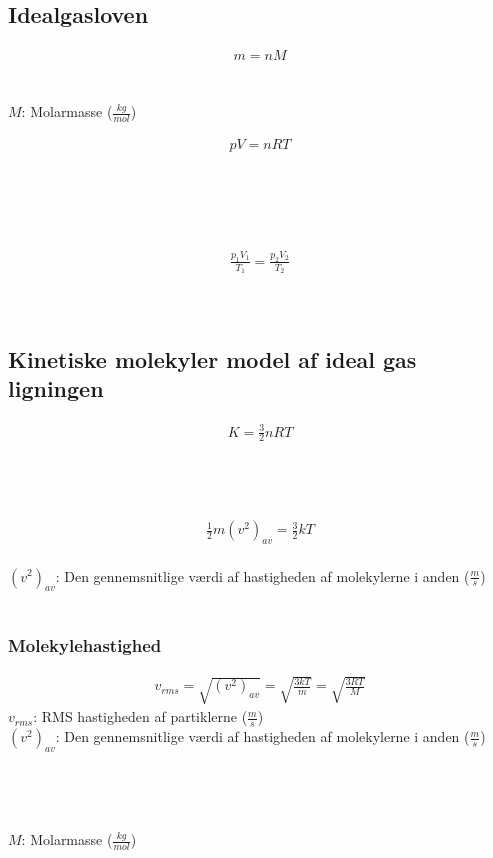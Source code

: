 \subsection{Idealgasloven}
	\begin{align}
		m=nM
	\end{align}
	\masse\\
	\mol\\
	$M$: Molarmasse ($\frac{kg}{mol}$)

	\begin{align}
		pV=nRT
	\end{align}
	\tryk\\
	\volumen\\
	\mol\\
	\idealgaskonst\\
	\tempk

	\begin{align}
		\frac{p_1V_1}{T_1}=\frac{p_2V_2}{T_2}
	\end{align}
	\tryk\\
	\volumen\\
	\tempk

	\newpage
\subsection{Kinetiske molekyler model af ideal gas ligningen}
	\begin{align}
		K=\frac{3}{2}nRT
	\end{align}
	\kinenergi\\
	\mol\\
	\idealgaskonst\\
	\tempk

	\begin{align}
		\frac{1}{2}m(v^2)_{av}=\frac{3}{2}kT
	\end{align}
	\masse\\
	$(v^2)_{av}$: Den gennemsnitlige værdi af hastigheden af molekylerne i anden ($\frac{m}{s}$)\\
	\boltzkonst\\
	\tempk

	\subsubsection{Molekylehastighed}
		\begin{align}
			v_{rms}=\sqrt{(v^2)_{av}}=\sqrt{\frac{3kT}{m}}=\sqrt{\frac{3RT}{M}}
		\end{align}
		$v_{rms}$: RMS hastigheden af partiklerne ($\frac{m}{s}$)\\
		$(v^2)_{av}$: Den gennemsnitlige værdi af hastigheden af molekylerne i anden ($\frac{m}{s}$)\\
		\boltzkonst\\
		\tempk\\
		\masse\\
		\idealgaskonst\\
		$M$: Molarmasse ($\frac{kg}{mol}$)
	
